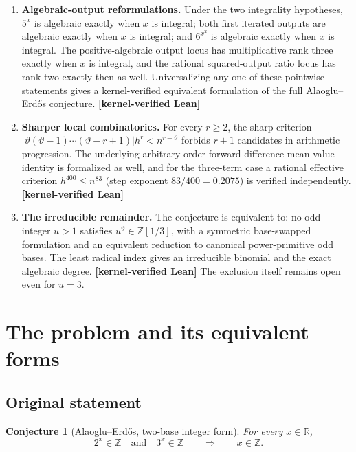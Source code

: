 \documentclass[11pt,oneside]{article}
\newtheorem{conjecture}[theorem]{Conjecture}
\theoremstyle{definition}
\theoremstyle{remark}
\newcommand{\Z}{\mathbb Z}
\newcommand{\R}{\mathbb R}
\newcommand{\thetaq}{\vartheta}
\newcommand{\Zthree}{\Z[1/3]}
\newcommand{\statuslean}{\textcolor{leanblue}{\textbf{[kernel-verified Lean]}}}
\begin{document}
\begin{enumerate}
hull of those units.  Outside these loci the output is transcendental.  In particular, at least one
of $2^{x^2},3^{x^2}$ is transcendental, every $(2^i3^j)^{x^2}$ with $i,j>0$ is
transcendental, and the algebraic ratio-output locus has lattice rank at most one.
\statuslean
\item \textbf{Algebraic-output reformulations.}  Under the two integrality hypotheses,
$5^x$ is algebraic exactly when $x$ is integral; both first iterated outputs are algebraic
exactly when $x$ is integral; and $6^{x^2}$ is algebraic exactly when $x$ is integral.
The positive-algebraic output locus has multiplicative rank three exactly when $x$ is
integral, and the rational squared-output ratio locus has rank two exactly then as well.
Universalizing any one of these pointwise statements gives a kernel-verified equivalent
formulation of the full Alaoglu--Erd\H{o}s conjecture.  \statuslean
\item \textbf{Sharper local combinatorics.}  For every $r\ge2$, the sharp criterion
$|\thetaq(\thetaq-1)\cdots(\thetaq-r+1)|h^r<n^{r-\thetaq}$ forbids $r+1$ candidates in
arithmetic progression.  The underlying arbitrary-order forward-difference mean-value
identity is formalized as well, and for the three-term case a rational effective criterion
$h^{400}\le n^{83}$ (step exponent $83/400=0.2075$) is verified independently.  \statuslean
\item \textbf{The irreducible remainder.}  The conjecture is equivalent to: no odd integer
$u>1$ satisfies $u^{\thetaq}\in\Zthree$, with a symmetric base-swapped formulation and an
equivalent reduction to canonical power-primitive odd bases.  The least radical index gives
an irreducible binomial and the exact algebraic degree.  \statuslean{}  The exclusion itself
remains open even for $u=3$.
\end{enumerate}

\section{The problem and its equivalent forms}
\label{sec:problem}

\subsection{Original statement}

\begin{conjecture}[Alaoglu--Erd\H{o}s, two-base integer form]
\label{conj:AE}
For every $x\in\R$,
\[
   2^x\in\Z\quad\text{and}\quad 3^x\in\Z
   \qquad\Longrightarrow\qquad x\in\Z.
\]
\end{conjecture}
\end{document}
